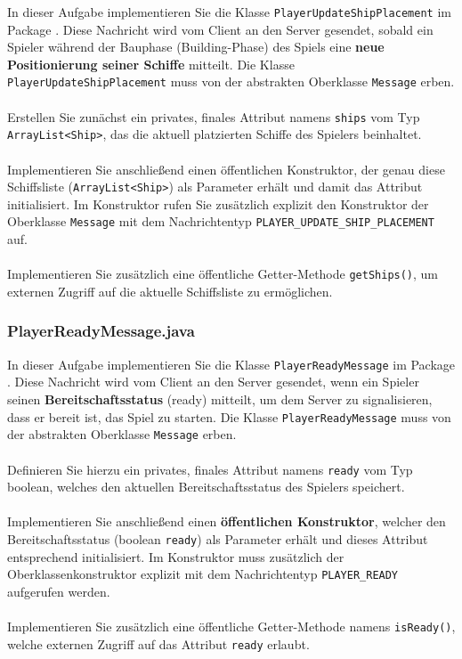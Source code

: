 \documentclass[12pt]{article}
\begin{document}
In dieser Aufgabe implementieren Sie die Klasse \texttt{PlayerUpdateShipPlacement} im Package . 
Diese Nachricht wird vom Client an den Server gesendet, 
sobald ein Spieler während der Bauphase (\glqq Building-Phase\grqq) des Spiels 
eine \textbf{neue Positionierung seiner Schiffe} mitteilt. 
Die Klasse \texttt{PlayerUpdateShipPlacement} muss von der abstrakten Oberklasse \texttt{Message} erben.
\\ \\
Erstellen Sie zunächst ein privates, finales Attribut namens \texttt{ships} vom Typ \texttt{ArrayList\hspace{0pt}<Ship>}, 
das die aktuell platzierten Schiffe des Spielers beinhaltet.
\\ \\
Implementieren Sie anschließend einen öffentlichen Konstruktor, 
der genau diese Schiffsliste (\texttt{ArrayList\hspace{0pt}<Ship>}) als Parameter erhält 
und damit das Attribut initialisiert. 
Im Konstruktor rufen Sie zusätzlich explizit den Konstruktor der Oberklasse \texttt{Message} 
mit dem Nachrichtentyp \texttt{PLAYER\_UPDATE\_SHIP\_PLACEMENT} auf.
\\ \\
Implementieren Sie zusätzlich eine öffentliche Getter-Methode \texttt{getShips()}, 
um externen Zugriff auf die aktuelle Schiffsliste zu ermöglichen.

\subsubsection*{PlayerReadyMessage.java}

In dieser Aufgabe implementieren Sie die Klasse \texttt{PlayerReadyMessage} im Package . 
Diese Nachricht wird vom Client an den Server gesendet, 
wenn ein Spieler seinen \textbf{Bereitschaftsstatus} (ready) mitteilt, 
um dem Server zu signalisieren, dass er bereit ist, das Spiel zu starten. 
Die Klasse \texttt{PlayerReadyMessage} muss von der abstrakten Oberklasse \texttt{Message} erben.
\\ \\
Definieren Sie hierzu ein privates, finales Attribut namens \texttt{ready} vom Typ boolean, 
welches den aktuellen Bereitschaftsstatus des Spielers speichert.
\\ \\
Implementieren Sie anschließend einen \textbf{öffentlichen Konstruktor}, 
welcher den Bereitschaftsstatus (boolean \texttt{ready}) als Parameter erhält 
und dieses Attribut entsprechend initialisiert. 
Im Konstruktor muss zusätzlich der Oberklassenkonstruktor explizit 
mit dem Nachrichtentyp \texttt{PLAYER\_READY} aufgerufen werden.
\\ \\
Implementieren Sie zusätzlich eine öffentliche Getter-Methode namens \texttt{isReady()}, 
welche externen Zugriff auf das Attribut \texttt{ready} erlaubt.
\end{document}
